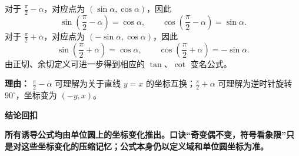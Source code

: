 \begin{proofbox}
\begin{description}[style=nextline, leftmargin=2.8em, labelsep=0.5em, itemsep=0.55em]
    \item[\textbf{步骤六（推出变名公式）：}] 对于 $\frac{\pi}{2}-\alpha$，对应点为 $(\sin\alpha,\cos\alpha)$，因此
    \[
    \sin\left(\frac{\pi}{2}-\alpha\right)=\cos\alpha,
    \qquad
    \cos\left(\frac{\pi}{2}-\alpha\right)=\sin\alpha.
    \]
    对于 $\frac{\pi}{2}+\alpha$，对应点为 $(-\sin\alpha,\cos\alpha)$，因此
    \[
    \sin\left(\frac{\pi}{2}+\alpha\right)=\cos\alpha,
    \qquad
    \cos\left(\frac{\pi}{2}+\alpha\right)=-\sin\alpha.
    \]
    由正切、余切定义可进一步得到相应的 $\tan$、$\cot$ 变名公式。
    \par\textbf{理由：} $\frac{\pi}{2}-\alpha$ 可理解为关于直线 $y=x$ 的坐标互换；$\frac{\pi}{2}+\alpha$ 可理解为逆时针旋转 $90^\circ$，坐标变为 $(-y,x)$。
\end{description}

\medskip
\textbf{\textcolor{CProof}{结论回扣}}

\textbf{所有诱导公式均由单位圆上的坐标变化推出。口诀“奇变偶不变，符号看象限”只是对这些坐标变化的压缩记忆；公式本身仍以定义域和单位圆坐标为准。}
\end{proofbox}
